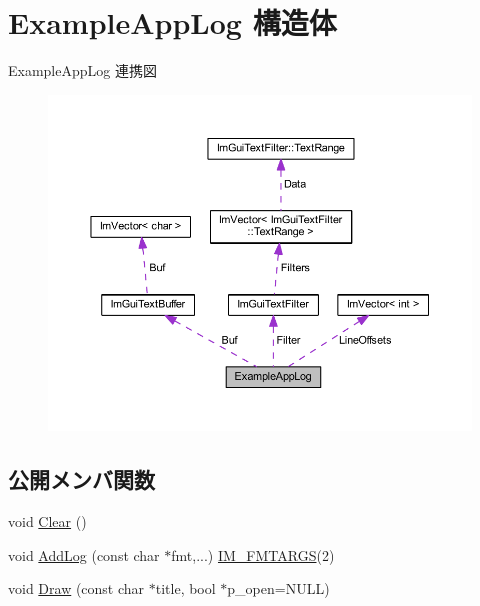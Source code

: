 \hypertarget{struct_example_app_log}{}\section{Example\+App\+Log 構造体}
\label{struct_example_app_log}


Example\+App\+Log 連携図\nopagebreak
\begin{figure}[H]
\begin{center}
\leavevmode
\includegraphics[width=350pt]{struct_example_app_log__coll__graph}
\end{center}
\end{figure}
\subsection*{公開メンバ関数}
\begin{DoxyCompactItemize}
\item 
void \mbox{\hyperlink{struct_example_app_log_ab9c298defddbb106fdfe4ab16c5eebac}{Clear}} ()
\item 
void \mbox{\hyperlink{struct_example_app_log_afd296fb3b2559acd341fd92883f8f571}{Add\+Log}} (const char $\ast$fmt,...) \mbox{\hyperlink{imgui_8h_a1251c2f9ddac0873dbad8181bd82c9f1}{I\+M\+\_\+\+F\+M\+T\+A\+R\+GS}}(2)
\item 
void \mbox{\hyperlink{struct_example_app_log_a5ad3a4bdb89171b84aeaff96948a1f77}{Draw}} (const char $\ast$title, bool $\ast$p\+\_\+open=N\+U\+LL)
\end{DoxyCompactItemize}
